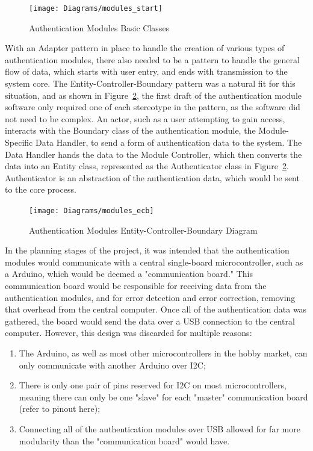\documentclass[12pt]{report}
\begin{document}
\begin{figure}
    \texttt{[image: Diagrams/modules\_start]}
    \caption{Authentication Modules Basic Classes}
    \label{fig:modules-start}
\end{figure}

With an Adapter pattern in place to handle the creation of various types of authentication modules, there also needed to 
be a pattern to handle the general flow of data, which starts with user entry, and ends with transmission to the system
core. The Entity-Controller-Boundary pattern was a natural fit for this situation, and as shown in 
Figure~\ref{fig:modules-ecb}, the first draft of the authentication module software only required one of each 
stereotype in the pattern, as the software did not need to be complex. An actor, such as a user attempting to gain 
access, interacts with the Boundary class of the authentication module, the Module-Specific Data Handler, to send a 
form of authentication data to the system. The Data Handler hands the data to the Module Controller, which then 
converts the data into an Entity class, represented as the Authenticator class in Figure~\ref{fig:modules-ecb}. 
Authenticator is an abstraction of the authentication data, which would be sent to the core process.

\begin{figure}
    \texttt{[image: Diagrams/modules\_ecb]}
    \caption{Authentication Modules Entity-Controller-Boundary Diagram}
    \label{fig:modules-ecb}
\end{figure}

In the planning stages of the project, it was intended that the authentication modules would communicate with a central 
single-board microcontroller, such as a Arduino, which would be deemed a "communication board." This communication board
would be responsible for receiving data from the authentication modules, and for error detection and error correction, 
removing that overhead from the central computer. Once all of the authentication data was gathered, the board would send 
the data over a USB connection to the central computer. However, this design was discarded for multiple reasons:
\begin{enumerate}
    \item The Arduino, as well as most other microcontrollers in the hobby market, can only communicate with another 
    Arduino over I2C;
    \item There is only one pair of pins reserved for I2C on most microcontrollers, meaning there can only be one 
    "slave" for each "master" communication board (refer to pinout here);
    \item Connecting all of the authentication modules over USB allowed for far more modularity than the "communication
    board" would have.
\end{enumerate}
\end{document}
